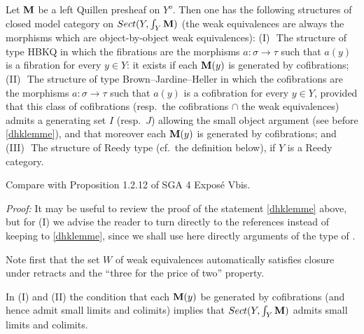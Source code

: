 \begin{theorem}
\label{sectionscmf}
Let ${\bf M}$ be a left Quillen presheaf on $Y^o$. Then one has the following
structures of closed model category on $Sect (Y,\int
_Y{\bf M} )$ (the weak equivalences are always the morphisms which are
object-by-object weak equivalences):
\newline
(I)\,\, The structure of type HBKQ in which the fibrations are the morphisms
$a:\sigma \rightarrow \tau $ such that $a(y)$ is a fibration for every $y\in
Y$: it exists if each ${\bf M} (y)$ is generated by cofibrations;
\newline
(II)\,\, The structure of type Brown--Jardine--Heller in which the cofibrations
are the morphisms $a:\sigma \rightarrow \tau$ such that $a(y)$ is a cofibration
for every $y\in Y$,
provided that this class of cofibrations (resp.\ the cofibrations $\cap$ the
weak equivalences) admits a generating set $I$ (resp.\ $J$) allowing the small
object argument
(see before \ref{dhklemme}),
and that moreover each ${\bf M} (y)$ is generated by cofibrations; and
\newline
(III)\,\, The structure of Reedy type (cf.\ the definition
below), if $Y$ is a Reedy category.
\end{theorem}
Compare with
Proposition 1.2.12 of SGA 4 \cite{SGA4b} Exposé Vbis.

\noindent
{\em Proof:}
It may be useful to review the proof of the statement \ref{dhklemme}
above, but for (I) we advise the reader to turn directly to the references
\cite{Hirschhorn} \cite{DHK} instead of keeping to \ref{dhklemme}, since we
shall use here directly arguments of the type of \cite{DHK}.

Note first that the set $W$ of weak equivalences automatically satisfies
closure under retracts and the ``three for the price of two'' property.

In (I) and (II) the condition that each ${\bf M} (y)$ be generated by
cofibrations (and
hence admit small limits and colimits) implies that
$Sect (Y,\int
_Y{\bf M} )$ admits small limits and colimits.


